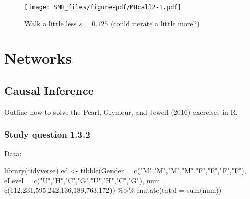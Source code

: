 \documentclass[
  letterpaper,
]{book}
\newenvironment{Shaded}{\begin{snugshade}}{\end{snugshade}}
\newcommand{\AttributeTok}[1]{\textcolor[rgb]{0.40,0.45,0.13}{#1}}
\newcommand{\DecValTok}[1]{\textcolor[rgb]{0.68,0.00,0.00}{#1}}
\newcommand{\FunctionTok}[1]{\textcolor[rgb]{0.28,0.35,0.67}{#1}}
\newcommand{\NormalTok}[1]{\textcolor[rgb]{0.00,0.23,0.31}{#1}}
\newcommand{\OtherTok}[1]{\textcolor[rgb]{0.00,0.23,0.31}{#1}}
\newcommand{\SpecialCharTok}[1]{\textcolor[rgb]{0.37,0.37,0.37}{#1}}
\newcommand{\StringTok}[1]{\textcolor[rgb]{0.13,0.47,0.30}{#1}}
\begin{document}
\begin{figure}

{\centering \texttt{[image: SMH\_files/figure-pdf/MHcall2-1.pdf]}

}

\caption{Walk a little less \(s=0.125\) (could iterate a little more?)}

\end{figure}

\part{Networks}

\hypertarget{causal-inference}{%
\chapter{Causal Inference}\label{causal-inference}}

Outline how to solve the Pearl, Glymour, and Jewell (2016) exercises in
R.

\hypertarget{study-question-1.3.2}{%
\section{Study question 1.3.2}\label{study-question-1.3.2}}

Data:

\begin{Shaded}
\begin{Highlighting}[]
\FunctionTok{library}\NormalTok{(tidyverse)}
\NormalTok{ed }\OtherTok{\textless{}{-}} \FunctionTok{tibble}\NormalTok{(}\AttributeTok{Gender =} \FunctionTok{c}\NormalTok{(}\StringTok{"M"}\NormalTok{,}\StringTok{"M"}\NormalTok{,}\StringTok{"M"}\NormalTok{,}\StringTok{"M"}\NormalTok{,}\StringTok{"F"}\NormalTok{,}\StringTok{"F"}\NormalTok{,}\StringTok{"F"}\NormalTok{,}\StringTok{"F"}\NormalTok{),}
             \AttributeTok{eLevel =} \FunctionTok{c}\NormalTok{(}\StringTok{"U"}\NormalTok{,}\StringTok{"H"}\NormalTok{,}\StringTok{"C"}\NormalTok{,}\StringTok{"G"}\NormalTok{,}\StringTok{"U"}\NormalTok{,}\StringTok{"H"}\NormalTok{,}\StringTok{"C"}\NormalTok{,}\StringTok{"G"}\NormalTok{),}
             \AttributeTok{num    =} \FunctionTok{c}\NormalTok{(}\DecValTok{112}\NormalTok{,}\DecValTok{231}\NormalTok{,}\DecValTok{595}\NormalTok{,}\DecValTok{242}\NormalTok{,}\DecValTok{136}\NormalTok{,}\DecValTok{189}\NormalTok{,}\DecValTok{763}\NormalTok{,}\DecValTok{172}\NormalTok{)) }\SpecialCharTok{\%\textgreater{}\%}
  \FunctionTok{mutate}\NormalTok{(}\AttributeTok{total =} \FunctionTok{sum}\NormalTok{(num))}
\end{Highlighting}
\end{Shaded}
\end{document}
